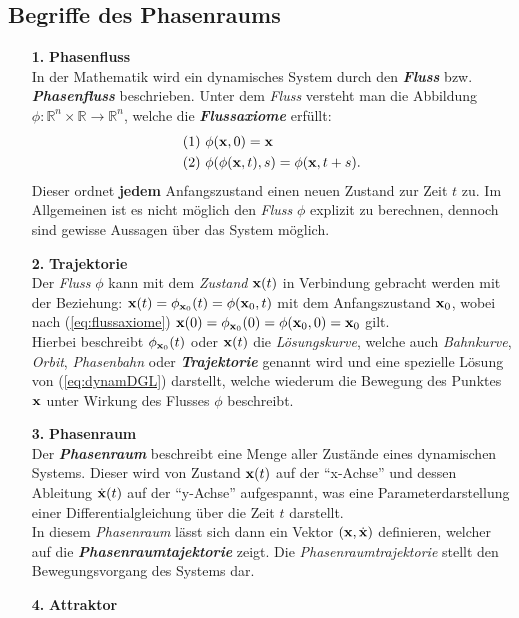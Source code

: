 \subsection{Begriffe des Phasenraums}
\label{sub:phasenraum}
\begin{itemize}
    \item[\textbf{1.}]\textbf{Phasenfluss}\\
    In der Mathematik wird ein dynamisches System durch den \textit{\textbf{Fluss}} bzw. \textit{\textbf{Phasenfluss}}  beschrieben. Unter dem \textit{Fluss} versteht man die Abbildung $\phi:\mathbb{R}^n\times\mathbb{R}\rightarrow\mathbb{R}^n$, welche die \textit{\textbf{Flussaxiome}} erfüllt:
    \begin{gather}
        \begin{aligned}
            (1)~&\phi(\boldsymbol{\mathbf{x}},0)=\boldsymbol{\mathbf{x}}\\
            (2)~&\phi(\phi(\boldsymbol{\mathbf{x}},t),s)=\phi(\boldsymbol{\mathbf{x}},t+s).
            \label{eq:flussaxiome}
        \end{aligned}
    \end{gather}
    Dieser ordnet \textbf{jedem} Anfangszustand einen neuen Zustand zur Zeit $t$ zu. Im Allgemeinen ist es nicht möglich den \textit{Fluss} $\phi$ explizit zu berechnen, dennoch sind gewisse Aussagen über das System möglich.
    \item[\textbf{2.}]\textbf{Trajektorie}\\
    Der \textit{Fluss} $\phi$ kann mit dem \textit{Zustand} $\boldsymbol{\mathbf{x}}(t)$ in Verbindung gebracht werden mit der Beziehung: $\boldsymbol{\mathbf{x}}(t)=\phi_{\boldsymbol{\mathbf{x}}_0}(t)=\phi(\boldsymbol{\mathbf{x}}_0,t)$ mit dem Anfangszustand $\boldsymbol{\mathbf{x}}_0$, wobei nach  (\ref{eq:flussaxiome}) $\boldsymbol{\mathbf{x}}(0)=\phi_{\boldsymbol{\mathbf{x}}_0}(0)=\phi(\boldsymbol{\mathbf{x}}_0,0)=\boldsymbol{\mathbf{x}}_0$ gilt.\\
    Hierbei beschreibt $\phi_{\boldsymbol{\mathbf{x}}_0}(t)$ oder $\boldsymbol{\mathbf{x}}(t)$ die \textit{Lösungskurve}, welche auch \textit{Bahnkurve}, \textit{Orbit}, \textit{Phasenbahn} oder \textit{\textbf{Trajektorie}} genannt wird und eine spezielle Lösung von (\ref{eq:dynamDGL}) darstellt, welche wiederum die Bewegung des Punktes $\boldsymbol{\mathbf{x}}$ unter Wirkung des Flusses $\phi$ beschreibt.
    \item[\textbf{3.}]\textbf{Phasenraum}\\
    Der \textit{\textbf{Phasenraum}} beschreibt eine Menge aller Zustände eines dynamischen Systems. Dieser wird von Zustand $\boldsymbol{\mathbf{x}}(t)$ auf der \enquote{x-Achse} und dessen Ableitung $\dot{\boldsymbol{\mathbf{x}}}(t)$ auf der \enquote{y-Achse} aufgespannt, was eine Parameterdarstellung einer Differentialgleichung über die Zeit $t$ darstellt.\\
    In diesem \textit{Phasenraum} lässt sich dann ein Vektor $(\boldsymbol{\mathbf{x}},\dot{\boldsymbol{\mathbf{x}}})$ definieren, welcher auf die \textit{\textbf{Phasenraumtajektorie}} zeigt. Die \textit{Phasenraumtrajektorie} stellt den Bewegungsvorgang des Systems dar.
    \item[\textbf{4.}]\textbf{Attraktor}\\
     
\end{itemize}


